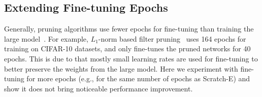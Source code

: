 \renewcommand{\arraystretch}{1.15}
\begin{table}[!htbp]
\small
\centering
{}
\caption{Results (accuracy) for $L_1$-norm based filter pruning~\cite{li2016pruning} when the models are aggressively pruned.
}
\label{significant-2}
\end{table}

\renewcommand{\arraystretch}{1.15}
\begin{table}[!htbp]
\small
\centering
{}
\caption{Results (accuracy) for unstructured  pruning~\cite{han2015learning} when the models are aggressively pruned.
}
\label{significant-3}
\end{table}

\subsection{Extending Fine-tuning Epochs}
Generally, pruning algorithms  use fewer epochs for fine-tuning than training the large model~\cite{li2016pruning,he2017channel,luo2017thinet}. For example, $L_1$-norm based filter pruning~\cite{li2016pruning} uses 164 epochs for training on CIFAR-10 datasets, and only fine-tunes the pruned networks for 40 epochs. This is due to that mostly small learning rates are used for fine-tuning to better preserve the weights from the large model.
Here we experiment with fine-tuning for more epochs (e.g., for the same number of epochs as Scratch-E) and show it does not bring noticeable performance improvement. 

